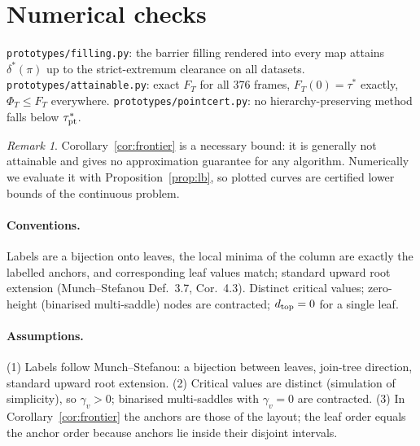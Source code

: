 \documentclass[11pt]{article}
\theoremstyle{remark}\newtheorem{remark}{Remark}
\begin{document}
\section{Numerical checks}\label{sec:numerics}
\texttt{prototypes/filling.py}: the barrier filling rendered into every map attains $\delta^*(\pi)$ up to the strict-extremum clearance on all datasets. \texttt{prototypes/attainable.py}: exact $F_T$ for all 376 frames, $F_T(0)=\tau^*$ exactly, $\Phi_T\le F_T$ everywhere. \texttt{prototypes/pointcert.py}: no hierarchy-preserving method falls below $\tau^*_{\rm pt}$.

\begin{remark}Corollary~\ref{cor:frontier} is a necessary bound: it is generally not attainable and gives no approximation guarantee for any algorithm. Numerically we evaluate it with Proposition~\ref{prop:lb}, so plotted curves are certified lower bounds of the continuous problem.\end{remark}
\paragraph{Conventions.} Labels are a bijection onto leaves, the local minima of the column are exactly the labelled anchors, and corresponding leaf values match; standard upward root extension (Munch--Stefanou Def.~3.7, Cor.~4.3). Distinct critical values; zero-height (binarised multi-saddle) nodes are contracted; $d_{\rm top}=0$ for a single leaf.
\paragraph{Assumptions.} (1) Labels follow Munch--Stefanou: a bijection between leaves, join-tree direction, standard upward root extension. (2) Critical values are distinct (simulation of simplicity), so $\gamma_v>0$; binarised multi-saddles with $\gamma_v=0$ are contracted. (3) In Corollary~\ref{cor:frontier} the anchors are those of the layout; the leaf order equals the anchor order because anchors lie inside their disjoint intervals.
\end{document}
